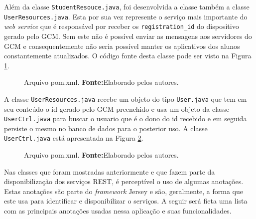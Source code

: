 	\par Além da classe \texttt{StudentResouce.java}, foi desenvolvida
a classe também a classe \texttt{UserResources.java}. Esta por sua vez
represente o serviço mais importante do \textit{web service} que é responsável
por receber os \texttt{registration\_id} do dispositivo gerado pelo GCM. Sem
este não é possível enviar as mensagens aos servidores do GCM e
consequentemente não seria possível manter os aplicativos  dos alunos
constantemente atualizados. O código fonte desta classe pode ser visto na
Figura \ref{fig:desws25}.

	\begin{figure}[h!]
		
		\caption[Arquivo \texttt{pom.xml}]{Arquivo pom.xml.
		\textbf{Fonte:}Elaborado pelos autores.}
		\label{fig:desws25}
	\end{figure}
	
	\par A classe \texttt{UserResources.java} recebe um objeto do tipo
\texttt{User.java} que tem em seu conteúdo o id gerado pelo GCM preenchido e
usa um objeto da classe \texttt{UserCtrl.java} para buscar o usuario que é o
dono do id recebido e em seguida persiste o mesmo no banco de dados para o
posterior uso. A classe \texttt{UserCtrl.java} está apresentada na Figura
\ref{fig:desws26}.

	\begin{figure}[h!]
		
		\caption[Arquivo \texttt{pom.xml}]{Arquivo pom.xml.
		\textbf{Fonte:}Elaborado pelos autores.}
		\label{fig:desws26}
	\end{figure}
	
	\pagebreak
	
	\par Nas classes que foram mostradas anteriormente e que fazem parte da
disponibilização dos serviços REST, é perceptível o uso de algumas anotações.
Estas anotações são parte do \textit{framework} Jersey e são, geralmente, a forma que
este usa para identificar e disponibilizar o serviços. A seguir será fieta uma
lista com as principais anotações usadas nessa aplicação e suas funcionalidades.

